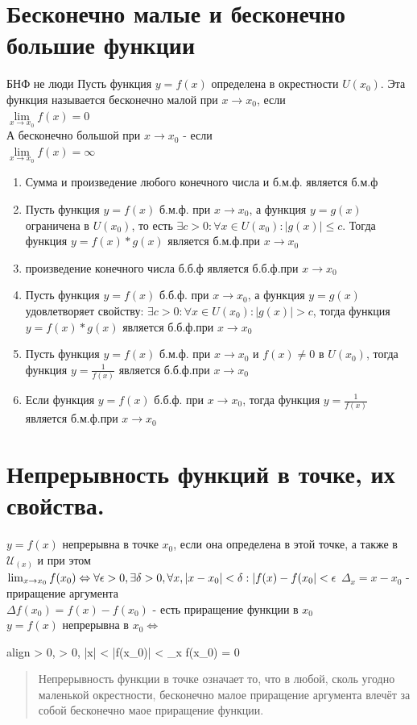 \documentclass[oneside]{book}
\newcommand{\boxedeq}[2]{\begin{empheq}[box={\fboxsep=6pt\fbox}]{align}\label{#1}#2\end{empheq}}
\begin{document}
\begin{enumerate}
\chapter{Бесконечно малые и бесконечно большие функции}
БНФ не люди
Пусть функция $y = f(x)$ определена в окрестности $U(x_0)$. Эта функция называется бесконечно малой при $x \rightarrow x_0$, если\\ $\lim\limits_{x\rightarrow x_0}f(x)=0$\\
А бесконечно большой при $x \rightarrow x_0$ - если\\ $\lim\limits_{x\rightarrow x_0}f(x)=\infty$
\begin{enumerate}
	\item Сумма и произведение любого конечного числа и б.м.ф. является б.м.ф
	\item Пусть функция $y = f(x)$ б.м.ф. при $x \rightarrow x_0$, а функция $y = g(x)$ ограничена в $U(x_0)$, то есть  $\exists c > 0 : \forall x \in U(x_0): |g(x)|\leq c$. Тогда функция $y=f(x)*g(x)$ является б.м.ф.при $x \rightarrow x_0$
	\item произведение конечного числа б.б.ф является б.б.ф.при $x \rightarrow x_0$
	\item Пусть функция $y = f(x)$ б.б.ф. при $x \rightarrow x_0$, а функция $y = g(x)$ удовлетворяет свойству: $\exists c > 0 : \forall x \in U(x_0): |g(x)| > c$, тогда функция $y=f(x)*g(x)$ является б.б.ф.при $x \rightarrow x_0$
	\item Пусть функция $y = f(x)$ б.м.ф. при $x \rightarrow x_0$ и $f(x) \neq 0$ в $U(x_0)$, тогда функция $y=\frac{1}{f(x)}$ является б.б.ф.при $x \rightarrow x_0$
	\item Если функция $y = f(x)$ б.б.ф. при $x \rightarrow x_0$, тогда функция $y=\frac{1}{f(x)}$ является б.м.ф.при $x \rightarrow x_0$
\end{enumerate}

\setcounter{chapter}{10}
\chapter[Непрерывность]{Непрерывность функций в точке, их свойства.}
$y = f(x)$ непрерывна в точке $x_0$, если она определена в этой точке, а также в $\mathcal{U}_{(x)}$ и при этом
$\lim_{x \rightarrow x_0}{f(x_0) \Leftrightarrow \\ \forall \epsilon > 0, \exists \delta > 0, \forall x, |x - x_0|
< \delta : |f(x) - f(x_0| < \epsilon }$
$\Delta_x = x-x_0$ - приращение аргумента \\
$\Delta f(x_0) = f(x) - f(x_0)$ - есть приращение функции в $x_0$ \\
$y = f(x)$ непрерывна в $x_0 \Leftrightarrow$
\boxedeq{eq:*}{
    \forall \epsilon > 0, \exists \delta > 0, |\Delta x| < \delta \Rightarrow |\Delta f(x_0)|
    < \epsilon \Leftrightarrow \lim_{\Delta x \rightarrow 0}{\Delta f(x_0)} = 0
}
\begin{quote}
    Непрерывность функции в точке означает то, что в любой, сколь угодно маленькой окрестности, бесконечно малое приращение аргумента
    влечёт за собой бесконечно маое приращение функции.
\end{quote}


\end{enumerate}
\end{document}
